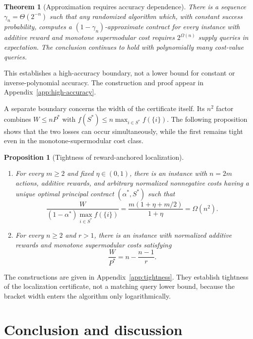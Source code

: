 \documentclass[11pt]{article}
\newtheorem{theorem}{Theorem}
\newtheorem{proposition}[proposition]{Proposition}
\begin{document}
\begin{theorem}[Approximation requires accuracy dependence]
\label{thm:approx-lower}
There is a sequence $\gamma_n=\Theta(2^{-n})$ such that any randomized
algorithm which, with constant success probability, computes a
$(1-\gamma_n)$-approximate contract for every instance with additive reward
and monotone supermodular cost requires $2^{\Omega(n)}$ supply queries in
expectation.  The conclusion continues to hold with polynomially many
cost-value queries.
\end{theorem}

This establishes a high-accuracy boundary, not a lower bound for constant or
inverse-polynomial accuracy.  The construction and proof appear in
Appendix~\ref{app:high-accuracy}.

A separate boundary concerns the width of the certificate itself.  Its
$n^2$ factor combines $W\leq nP^*$ with
$f(S^*)\leq n\max_{i\in S^*}f(\{i\})$.  The following proposition shows that
the two losses can occur simultaneously, while the first remains tight even
in the monotone-supermodular cost class.

\begin{proposition}[Tightness of reward-anchored localization]
\label{prop:tightness}
\begin{enumerate}
\item[(i)] For every $m\geq2$ and fixed $\eta\in(0,1)$, there is an instance
with $n=2m$ actions, additive rewards, and arbitrary normalized nonnegative
costs having a unique optimal principal contract $(\alpha^*,S^*)$ such that
\[
\frac{W}{(1-\alpha^*)\max_{i\in S^*}f(\{i\})}
=\frac{m(1+\eta+m/2)}{1+\eta}=\Omega(n^2).
\]
\item[(ii)] For every $n\geq2$ and $r>1$, there is an instance with
normalized additive rewards and monotone supermodular costs satisfying
\[
                         \frac{W}{P^*}=n-\frac{n-1}{r}.
\]
\end{enumerate}
\end{proposition}

The constructions are given in Appendix~\ref{app:tightness}.  They establish
tightness of the localization certificate, not a matching query lower bound,
because the bracket width enters the algorithm only logarithmically.

\section{Conclusion and discussion}\label{sec:conclusion}
\end{document}
